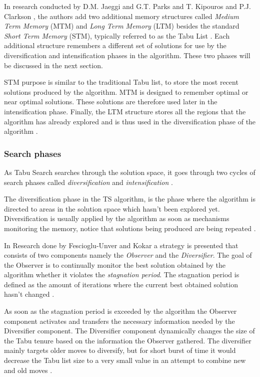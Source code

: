 In research conducted by D.M. Jaeggi and G.T. Parks and T. Kipouros and P.J. Clarkson \cite{MultiObjTabu}, the authors add two additional memory structures called \emph{Medium Term Memory} (MTM) and \emph{Long Term Memory} (LTM) besides the standard \emph{Short Term Memory} (STM), typically referred to as the Tabu List \cite{MultiObjTabu} . Each additional structure remembers a different set of solutions for use by the diversification and intensification phases in the algorithm. These two phases will be discussed in the next section.

STM purpose is similar to the traditional Tabu list, to store the most recent solutions produced by the algorithm. MTM is designed to remember optimal or near optimal solutions. These solutions are therefore used later in the intensification phase. Finally, the LTM structure stores all the regions that the algorithm has already explored and is thus used in the diversification phase of the algorithm \cite{MultiObjTabu}.

\subsubsection{Search phases}
As Tabu Search searches through the solution space, it goes through two cycles of search phases called \emph{diversification} and \emph{intensification} \cite{TabuParameterization,TabuCrewSchedulingProblem,NonlinearGlobalTabu,SelfControllingReactiveTabu}.

The diversification phase in the TS algorithm, is the phase where the algorithm is directed to areas in the solution space which hasn't been explored yet. Diversification is usually applied by the algorithm as soon as mechanisms monitoring the memory, notice that solutions being produced are being repeated \cite{ReactiveTabuVHR,SelfControllingReactiveTabu}. 

In Research done by Fescioglu-Unver and Kokar \cite{SelfControllingReactiveTabu} a strategy is presented that consists of two components namely the \emph{Observer} and the \emph{Diversifier}. The goal of the Observer is to continually monitor the best solution obtained by the algorithm whether it violates the \emph{stagnation period}. The stagnation period is defined as the amount of iterations where the current best obtained solution hasn't changed \cite{SelfControllingReactiveTabu}. 

As soon as the stagnation period is exceeded by the algorithm the Observer component activates and transfers the necessary information needed by the Diversifier component. The Diversifier component dynamically changes the size of the Tabu tenure based on the information the Observer gathered. The diversifier mainly targets older moves to diversify, but for short burst of time it would decrease the Tabu list size to a very small value in an attempt to combine new and old moves \cite{SelfControllingReactiveTabu}.

